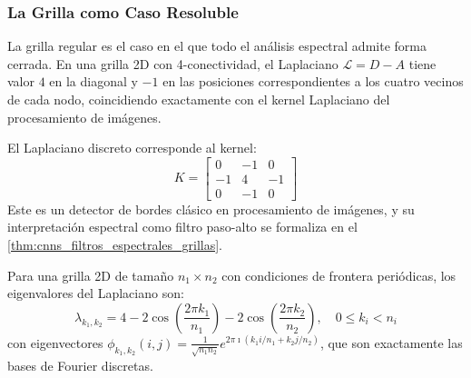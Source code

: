 \subsubsection{La Grilla como Caso Resoluble}

La grilla regular es el caso en el que todo el análisis espectral admite forma cerrada. En una grilla 2D con 4-conectividad, el Laplaciano $\mathcal{L} = D - A$ tiene valor $4$ en la diagonal y $-1$ en las posiciones correspondientes a los cuatro vecinos de cada nodo, coincidiendo exactamente con el kernel Laplaciano del procesamiento de imágenes.

\begin{example}
El Laplaciano discreto corresponde al kernel:
\[
K = \begin{bmatrix}
 0 & -1 &  0 \\
-1 &  4 & -1 \\
 0 & -1 &  0
\end{bmatrix}
\]
Este es un detector de bordes clásico en procesamiento de imágenes, y su interpretación espectral como filtro paso-alto se formaliza en el \autoref{thm:cnns_filtros_espectrales_grillas}.
\end{example}

\begin{proposition}\label{prop:eigenvalores_laplaciano_grilla}
Para una grilla 2D de tamaño $n_1 \times n_2$ con condiciones de frontera periódicas, los eigenvalores del Laplaciano son:
\begin{equation}
\lambda_{k_1,k_2} = 4 - 2\cos\!\left(\frac{2\pi k_1}{n_1}\right) - 2\cos\!\left(\frac{2\pi k_2}{n_2}\right), \quad 0 \leq k_i < n_i
\end{equation}
con eigenvectores $\phi_{k_1,k_2}(i,j) = \frac{1}{\sqrt{n_1 n_2}} e^{2\pi \imath(k_1 i/n_1 + k_2 j/n_2)}$, que son exactamente las bases de Fourier discretas.
\end{proposition}

